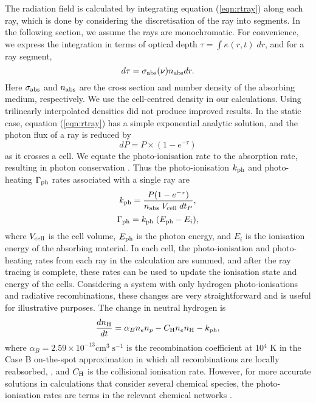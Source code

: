 \documentclass[useAMS,usenatbib]{mn2e}
\begin{document}
The radiation field is calculated by integrating equation
(\ref{eqn:rtray}) along each ray, which is done by considering the
discretisation of the ray into segments.  In the following section, we
assume the rays are monochromatic.  For convenience, we express the
integration in terms of optical depth $\tau = \int \kappa(r,t) \; dr$,
and for a ray segment,
%
\begin{equation}
  \label{eqn:dtau}
  d\tau = \sigma_{\rm abs}(\nu) n_{\rm abs} dr.
\end{equation}
Here $\sigma_{\rm abs}$ and $n_{\rm abs}$ are the cross section and
number density of the absorbing medium, respectively.  We use the
cell-centred density in our calculations.  Using trilinearly
interpolated densities \citep[see][]{Mellema06} did not produce
improved results.  In the static case, equation (\ref{eqn:rtray}) has
a simple exponential analytic solution, and the photon flux of a ray
is reduced by
%
\begin{equation}
  \label{eqn:flux}
  dP = P \times (1 - e^{-\tau})
\end{equation}
as it crosses a cell.  We equate the photo-ionisation rate to the
absorption rate, resulting in photon conservation \citep{Abel99_RT,
  Mellema06}.  Thus the photo-ionisation $k_{\rm ph}$ and
photo-heating $\Gamma_{\rm ph}$ rates associated with a single ray are
%
\begin{equation}
  \label{eqn:kph}
  k_{\rm ph} = \frac{P (1 - e^{-\tau})}{n_{\rm abs} \; V_{\rm cell} \; dt_P},
\end{equation}
\begin{equation}
  \label{eqn:gamma}
  \Gamma_{\rm ph} = k_{\rm ph} \; (E_{\rm ph} - E_i),
\end{equation}
where $V_{\rm cell}$ is the cell volume, $E_{\rm ph}$ is the photon
energy, and $E_i$ is the ionisation energy of the absorbing material.
In each cell, the photo-ionisation and photo-heating rates from each
ray in the calculation are summed, and after the ray tracing is
complete, these rates can be used to update the ionisation state and
energy of the cells.  Considering a system with only hydrogen
photo-ionisations and radiative recombinations, these changes are very
straightforward and is useful for illustrative purposes.  The change
in neutral hydrogen is
%
\begin{equation}
\label{eqn:dndt}
\frac{dn_{\rm H}}{dt} = \alpha_B n_e n_p - C_{\rm H} n_e n_{\rm
  H} - k_{\rm ph},
\end{equation}
where $\alpha_B = 2.59 \times 10^{-13} \mathrm{cm}^3 \;
\mathrm{s}^{-1}$ is the recombination coefficient at 10$^4$ K in the
Case B on-the-spot approximation in which all recombinations are
locally reabsorbed, \citep{Spitzer78}, and $C_{\rm H}$ is the
collisional ionisation rate.  However, for more accurate solutions in
calculations that consider several chemical species, the
photo-ionisation rates are terms in the relevant chemical networks
\citep[e.g.][]{Abel97}.
\end{document}
